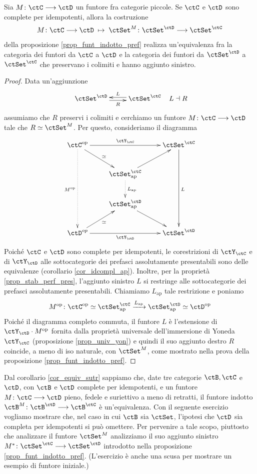 \begin{proposition}\label{prop_dualita_cat_pref}
 Sia \(M \colon \ctC \fun \ctD\) un funtore fra categorie piccole.
 Se \(\ctC\) e \(\ctD\) sono complete per idempotenti, allora la costruzione
 \[ M \colon \ctC \fun \ctD \; \mapsto \; \ctSet^M \colon \ctSet^{\ctD} \fun \ctSet^{\ctC} \]
 della proposizione \ref{prop_funt_indotto_pref} realizza un'equivalenza fra la categoria dei funtori da
 \(\ctC\) a \(\ctD\) e la categoria dei funtori da \(\ctSet^{\ctD}\) a
 \(\ctSet^{\ctC}\) che preservano i colimiti e hanno aggiunto sinistro.
\end{proposition}

\begin{proof}
 Data un'aggiunzione
 \[ \xymatrix{\ctSet^{\ctD} \ar@<-0.5ex>[r]_-{R} & \ctSet^{\ctC} \ar@<-0.5ex>[l]_-{L} } \;\;\; L \dashv R \]
 assumiamo che \(R\) preservi i colimiti e cerchiamo un funtore \(M \colon \ctC \fun \ctD\) tale che \(R \simeq \ctSet^M\).
 Per questo, consideriamo il diagramma
 \[ \xymatrix{\ctC^{\op} \ar@{.>}[ddd]_{M^{\op}} \ar[rr]^-{\ctY_{\ctC}} \ar[rd]^{\simeq} & & \ctSet^{\ctC} \ar[ddd]^{L} \\
  & \ctSet^{\ctC}_{\mathrm{ap}} \ar@{.>}[d]^{L_{\mathrm{ap}}} \ar[ru] \\
  & \ctSet^{\ctD}_{\mathrm{ap}} \ar[rd] \\
  \ctD^{op} \ar[ru]_{\simeq} \ar[rr]_-{\ctY_{\ctD}} & & \ctSet^{\ctD} } \]
 Poiché \(\ctC\) e \(\ctD\) sono complete per idempotenti, le corestrizioni di \(\ctY_{\ctC}\) e di \(\ctY_{\ctD}\) alle
 sottocategorie dei prefasci assolutamente presentabili sono delle equivalenze (corollario \ref{cor_idcompl_ap}).
 Inoltre, per la proprietà \ref{prop_stab_perf_pres}, l'aggiunto sinistro \(L\) si restringe alle sottocategorie dei prefasci
 assolutamente presentabili. Chiamiamo \(L_{\mathrm{ap}}\) tale restrizione e poniamo
 \[ M^{\op} \colon \ctC^{\op} \simeq \ctSet^{\ctC}_{\mathrm{ap}} \xto{L_{\mathrm{ap}}} \ctSet^{\ctD}_{\mathrm{ap}} \simeq \ctD^{\op} \]
 Poiché il diagramma completo commuta, il funtore \(L\) è l'estensione di \(\ctY_{\ctD} \cmp M^{\op}\) fornita dalla
 proprietà universale dell'immersione di Yoneda \(\ctY_{\ctC}\) (proposizione \ref{prop_univ_yon}) e quindi il suo aggiunto destro
 \(R\) coincide, a meno di iso naturale, con \(\ctSet^M\), come mostrato nella prova della proposizione \ref{prop_funt_indotto_pref}.
\end{proof}

Dal corollario \ref{cor_equiv_sutr} sappiamo che, date tre categorie \(\ctB, \ctC\) e \(\ctD\), con \(\ctB\) e \(\ctD\) complete per idempotenti,
e un funtore \(M \colon \ctC \fun \ctD\) pieno, fedele e suriettivo a meno di retratti, il funtore indotto \(\ctB^M \colon \ctB^\ctD \fun \ctB^\ctC\)
è un'equivalenza. Con il seguente esercizio vogliamo mostrare che, nel caso in cui \(\ctB\) sia \(\ctSet\), l'ipotesi che \(\ctD\) sia
completa per idempotenti si può omettere. Per pervenire a tale scopo, piuttosto che analizzare il funtore \(\ctSet^M\) analizziamo
il suo aggiunto sinistro \(M^* \colon \ctSet^\ctC \fun \ctSet^\ctD\) introdotto nella proposizione \ref{prop_funt_indotto_pref}.
(L'esercizio è anche una scusa per mostrare un esempio di funtore iniziale.)

